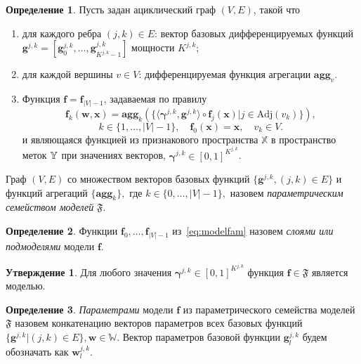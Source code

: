 \documentclass[11pt, a5paper]{dissert}
\theoremstyle{definition}
\newtheorem{defin}{Определение}
\newtheorem{utv}{Утверждение}
\begin{document}
\begin{defin}
Пусть задан ациклический граф $(V,E)$, такой что 
\begin{enumerate}
\item для каждого ребра $(j,k) \in E$: вектор базовых дифференцируемых функций  $\mathbf{g}^{j,k} = [\mathbf{g}^{j,k}_0, \dots, \mathbf{g}^{j,k}_{K^{j,k}-1}]$  мощности $K^{j,k}$;
\item для каждой вершины $v \in V$: дифференцируемая функция агрегации $\textbf{agg}_v$.
\item Функция $\mathbf{f} = \mathbf{f}_{|V|-1}$, задаваемая по правилу 
\begin{equation}
\label{eq:modelfam}
    \mathbf{f}_{k}(\mathbf{w}, \mathbf{x}) = \textbf{agg}_{k}\left(\{ \langle \boldsymbol{\gamma}^{j,k}, \mathbf{g}^{j,k} \rangle \circ  \mathbf{f}_j(\mathbf{x})| j \in \text{Adj}(v_k)\}\right), 
\end{equation}
\[
k \in \{1,\dots,|V|-1\}, \quad \mathbf{f}_0(\mathbf{x}) = \mathbf{x}, \quad v_k \in V. 
\]
и являющаяся функцией из признакового пространства $\mathbb{X}$ в пространство меток $\mathbb{Y}$ при значениях векторов, $\boldsymbol{\gamma}^{j,k} \in [0,1]^{K^{j,k}}$.
\end{enumerate}

Граф $(V, E)$ со множеством векторов базовых функций $\{\mathbf{g}^{j,k}, (j,k) \in E\}$ и функций агрегаций $\{\textbf{agg}_k\},$ где $k \in \{0, \dots, |V|-1\},$ назовем \textit{параметрическим семейством моделей} $\mathfrak{F}$.
\end{defin}


\begin{defin}
Функции $\mathbf{f}_0, \dots, \mathbf{f}_{|V|-1}$ из~\eqref{eq:modelfam} назовем \textit{слоями или подмоделями} модели $\mathbf{f}$.
\end{defin}

\begin{utv}
Для любого значения $\boldsymbol{\gamma}^{j,k} \in [0,1]^{K^{j,k}}$ функция $\mathbf{f} \in \mathfrak{F}$ является моделью.
\end{utv}



\begin{defin}
\textit{Параметрами }модели $\mathbf{f}$ из параметрического семейства моделей $\mathfrak{F}$  назовем конкатенацию векторов параметров всех базовых функций $\{\mathbf{g}^{j,k}| {(j,k) \in E} \}, \mathbf{w} \in \mathbb{W}.$ Вектор параметров базовой функции $\mathbf{g}^{j,k}_l$ будем обозначать как $\mathbf{w}^{j,k}_l$.
\end{defin}
\end{document}
